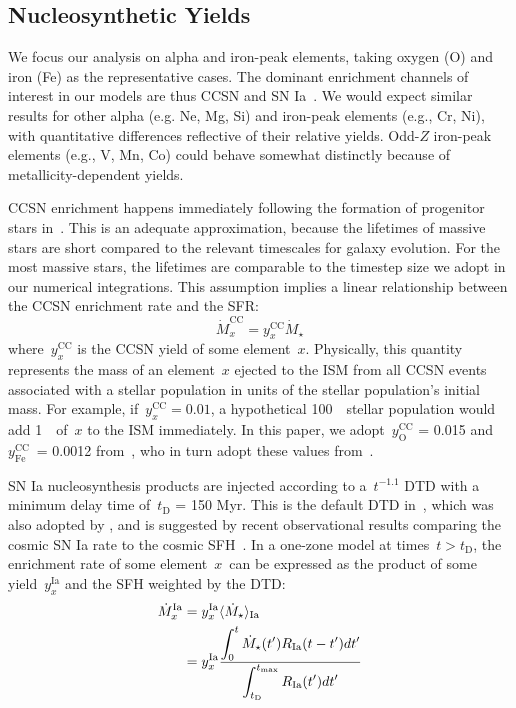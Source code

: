 \subsection{Nucleosynthetic Yields} 
\label{migration:sec:methods:yields} 
We focus our analysis on alpha and iron-peak elements, taking oxygen (O) and 
iron (Fe) as the representative cases. 
The dominant enrichment channels of interest in our models are thus CCSN and 
SN Ia~\citep{Johnson2019}. 
We would expect similar results for other alpha (e.g. Ne, Mg, Si) and 
iron-peak elements (e.g., Cr, Ni), with quantitative differences reflective of 
their relative yields. 
Odd-$Z$ iron-peak elements (e.g., V, Mn, Co) could behave somewhat distinctly 
because of metallicity-dependent yields. 
\par 
CCSN enrichment happens immediately following the formation of progenitor stars 
in~\vice. 
This is an adequate approximation, because the lifetimes of massive stars are 
short compared to the relevant timescales for galaxy evolution. 
For the most massive stars, the lifetimes are comparable to the timestep size 
we adopt in our numerical integrations. 
This assumption implies a linear relationship between the CCSN enrichment 
rate and the SFR: 
\begin{equation} 
\dot{M}_x^\text{CC} = y_x^\text{CC}\dot{M}_\star 
\end{equation} 
where~$y_x^\text{CC}$ is the CCSN yield of some element~$x$. Physically, this 
quantity represents the mass of an element~$x$ ejected to the ISM from all 
CCSN events associated with a stellar population in units of the stellar 
population's initial mass. 
For example, if~$y_x^\text{CC} = 0.01$, a hypothetical 100~\msun~stellar 
population would add 1~\msun~of~$x$ to the ISM immediately. 
In this paper, we adopt~$y_\text{O}^\text{CC}$ = 0.015 and 
$y_\text{Fe}^\text{CC}$~= 0.0012 from~\citet{Johnson2020}, who in turn adopt 
these values from~\citet{Weinberg2017b}. 
\par 
SN Ia nucleosynthesis products are injected according to a~$t^{-1.1}$ DTD with 
a minimum delay time of~$t_\text{D}$ = 150 Myr. 
This is the default DTD in~\vice, which was also adopted by 
\citet{Johnson2020}, and is suggested by recent observational results comparing 
the cosmic SN Ia rate to the cosmic SFH~\citep{Maoz2012a, Maoz2017}. 
In a one-zone model at times~$t > t_\text{D}$, the enrichment rate of some 
element~$x$~can be expressed as the product of some yield~$y_x^\text{Ia}$ and 
the SFH weighted by the DTD: 
\begin{subequations}\begin{align} 
\dot{M}_x^\text{Ia} &= y_x^\text{Ia}\langle\dot{M}_\star\rangle_\text{Ia} \\ 
&= y_x^\text{Ia}\frac{\displaystyle{
	\int_0^t \dot{M}_\star(t') R_\text{Ia}(t - t') dt' 
}}{\displaystyle{
	\int_{t_\text{D}}^{t_\text{max}} R_\text{Ia}(t')dt' 
}} 
\label{migration:eq:mdot_ia} 
\end{align}\end{subequations} 
